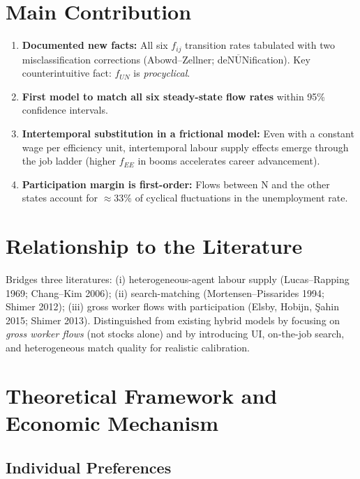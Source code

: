 \section{Main Contribution}

\begin{enumerate}
  \item \textbf{Documented new facts:} All six $f_{ij}$ transition rates
    tabulated with two misclassification corrections (Abowd--Zellner;
    de$\overline{\text{NUN}}$ification). Key counterintuitive fact:
    $f_{UN}$ is \emph{procyclical}.
  \item \textbf{First model to match all six steady-state flow rates} within
    95\% confidence intervals.
  \item \textbf{Intertemporal substitution in a frictional model:} Even with
    a constant wage per efficiency unit, intertemporal labour supply
    effects emerge through the job ladder (higher $f_{EE}$ in booms
    accelerates career advancement).
  \item \textbf{Participation margin is first-order:} Flows between N and
    the other states account for $\approx$33\% of cyclical fluctuations
    in the unemployment rate.
\end{enumerate}

\section{Relationship to the Literature}

Bridges three literatures: (i) heterogeneous-agent labour supply
(Lucas--Rapping 1969; Chang--Kim 2006); (ii) search-matching
(Mortensen--Pissarides 1994; Shimer 2012); (iii) gross worker flows with
participation (Elsby, Hobijn, \c{S}ahin 2015; Shimer 2013). Distinguished
from existing hybrid models by focusing on \emph{gross worker flows} (not
stocks alone) and by introducing UI, on-the-job search, and heterogeneous
match quality for realistic calibration.

\section{Theoretical Framework and Economic Mechanism}

\subsection*{Individual Preferences}

